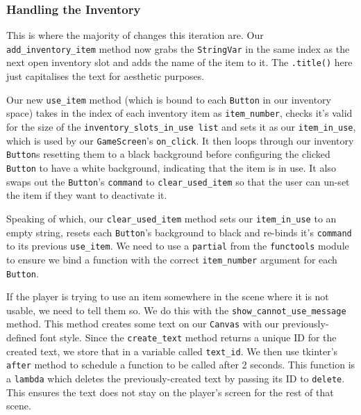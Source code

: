 \documentclass[a4paper,11pt,openany]{book}
\begin{document}
\subsubsection{Handling the Inventory}

This is where the majority of changes this iteration are. Our \lstinline[columns=fixed]{add_inventory_item} method now grabs the \lstinline[columns=fixed]{StringVar} in the same index as the next open inventory slot and adds the name of the item to it. The \lstinline[columns=fixed]{.title()} here just capitalises the text for aesthetic purposes. 

\vspace{5mm}

Our new \lstinline[columns=fixed]{use_item} method (which is bound to each \lstinline[columns=fixed]{Button} in our inventory space) takes in the index of each inventory item as \lstinline[columns=fixed]{item_number}, checks it's valid for the size of the \lstinline[columns=fixed]{inventory_slots_in_use list} and sets it as our \lstinline[columns=fixed]{item_in_use}, which is used by our \lstinline[columns=fixed]{GameScreen}'s \lstinline[columns=fixed]{on_click}. It then loops through our inventory \lstinline[columns=fixed]{Button}s resetting them to a black background before configuring the clicked \lstinline[columns=fixed]{Button} to have a white background, indicating that the item is in use. It also swaps out the \lstinline[columns=fixed]{Button}'s \lstinline[columns=fixed]{command} to \lstinline[columns=fixed]{clear_used_item} so that the user can un-set the item if they want to deactivate it. 

\vspace{5mm}

Speaking of which, our \lstinline[columns=fixed]{clear_used_item} method sets our \lstinline[columns=fixed]{item_in_use} to an empty string, resets each \lstinline[columns=fixed]{Button}'s background to black and re-binds it's \lstinline[columns=fixed]{command} to its previous \lstinline[columns=fixed]{use_item}. We need to use a \lstinline[columns=fixed]{partial} from the \lstinline[columns=fixed]{functools} module to ensure we bind a function with the correct \lstinline[columns=fixed]{item_number} argument for each \lstinline[columns=fixed]{Button}.

\vspace{5mm}

If the player is trying to use an item somewhere in the scene where it is not usable, we need to tell them so. We do this with the \lstinline[columns=fixed]{show_cannot_use_message} method. This method creates some text on our \lstinline[columns=fixed]{Canvas} with our previously-defined font style. Since the \lstinline[columns=fixed]{create_text} method returns a unique ID for the created text, we store that in a variable called \lstinline[columns=fixed]{text_id}. We then use tkinter's \lstinline[columns=fixed]{after} method to schedule a function to be called after 2 seconds. This function is a \lstinline[columns=fixed]{lambda} which deletes the previously-created text by passing its ID to \lstinline[columns=fixed]{delete}. This ensures the text does not stay on the player's screen for the rest of that scene. 
\end{document}
